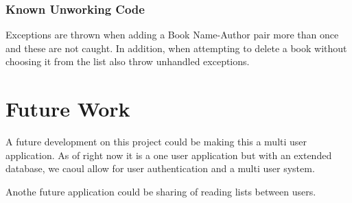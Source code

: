 \documentclass{article}
\begin{document}
\subsubsection*{Known Unworking Code}

Exceptions are thrown when adding a Book Name-Author pair more than once and these are not caught. In 
addition, when attempting to delete a book without choosing it from the list also throw unhandled exceptions.

\section*{Future Work}

A future development on this project could be making this a multi user application. As of right now it is a 
one user application but with an extended database, we caoul allow for user authentication and a multi user system.

Anothe future application could be sharing of reading lists between users.
\end{document}
